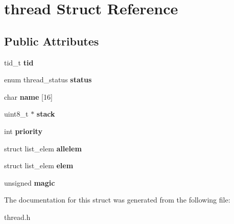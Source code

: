 \hypertarget{structthread}{}\section{thread Struct Reference}
\label{structthread}
\subsection*{Public Attributes}
\begin{DoxyCompactItemize}
\item 
tid\+\_\+t {\bfseries tid}\hypertarget{structthread_a7360cfa969a95354a5756946205b1138}{}\label{structthread_a7360cfa969a95354a5756946205b1138}

\item 
enum thread\+\_\+status {\bfseries status}\hypertarget{structthread_ac0b66a487cfb69469a807077cd801290}{}\label{structthread_ac0b66a487cfb69469a807077cd801290}

\item 
char {\bfseries name} \mbox{[}16\mbox{]}\hypertarget{structthread_a59ebdca51eb8eabddbe6d26b4c13c3ab}{}\label{structthread_a59ebdca51eb8eabddbe6d26b4c13c3ab}

\item 
uint8\+\_\+t $\ast$ {\bfseries stack}\hypertarget{structthread_a13be198956c306ad7f4ab1de2a91df73}{}\label{structthread_a13be198956c306ad7f4ab1de2a91df73}

\item 
int {\bfseries priority}\hypertarget{structthread_a04d1040ba1acd5961797345743567293}{}\label{structthread_a04d1040ba1acd5961797345743567293}

\item 
struct list\+\_\+elem {\bfseries allelem}\hypertarget{structthread_a21b7f77466e0383cc9dd51988ea131d6}{}\label{structthread_a21b7f77466e0383cc9dd51988ea131d6}

\item 
struct list\+\_\+elem {\bfseries elem}\hypertarget{structthread_a4542f0a9644fb012de20399c8e15c741}{}\label{structthread_a4542f0a9644fb012de20399c8e15c741}

\item 
unsigned {\bfseries magic}\hypertarget{structthread_a3a49980d160800cda815248d91e47052}{}\label{structthread_a3a49980d160800cda815248d91e47052}

\end{DoxyCompactItemize}


The documentation for this struct was generated from the following file\+:\begin{DoxyCompactItemize}
\item 
thread.\+h\end{DoxyCompactItemize}
